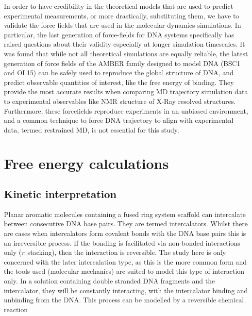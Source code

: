 \documentclass{report}
\begin{document}
In order to have credibility in the theoretical models that are used to predict experimental measurements, or more drastically, substituting them, we have to validate the force fields that are used in the molecular dynamics simulations. In particular, the last generation of force-fields for DNA systems specifically has raised questions about their validity especially at longer simulation timescales. It was found that while not all theoretical simulations are equally reliable, the latest generation of force fields of the AMBER family designed to model DNA (BSC1 and OL15) can be safely used to reproduce the global structure of DNA, and predict observable quantities of interest, like the free energy of binding. They provide the most accurate results when comparing MD trajectory simulation data to experimental observables like NMR structure of X-Ray resolved structures. Furthermore, these forcefields reproduce experiments in an unbiased environment, and a common technique to force DNA trajectory to align with experimental data, termed restrained MD, is not essential for this study.





\section{Free energy calculations}

\subsection{Kinetic interpretation}

Planar aromatic molecules containing a fused ring system scaffold can intercalate between consecutive DNA base pairs. They are termed intercalators. Whilst there are cases when intercalators form covalent bonds with the DNA base pairs this is an irreversible process. If the bonding is facilitated via non-bonded interactions only ($\pi$ stacking), then the interaction is reversible. The study here is only concerned with the later intercalation type, as this is the more common form and the tools used (molecular mechanics) are suited to model this type of interaction only. In a solution containing double stranded DNA fragments and the intercalator, they will be constantly interacting, with the intercalator binding and unbinding from the DNA. This process can be modelled by a reversible chemical reaction
\end{document}
